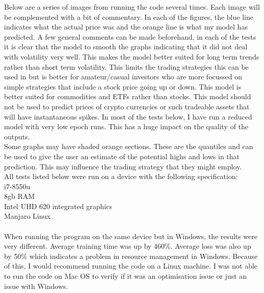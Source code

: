 \documentclass{article}
\begin{document}
Below are a series of images from running the code several times. Each image
will be complemented with a bit of commentary. In each of the figures, the blue
line indicates what the actual price was and the orange line is what my model
has predicted. A few general comments can be made beforehand, in each of the
tests it is clear that the model to smooth the graphs indicating that it did not
deal with volatility very well. This makes the model better suited for long term
trends rather than short term volatility. This limits the trading strategies this
can be used in but is better for amateur/casual investors who are more focussed
on simple strategies that include a stock price going up or down. This model is
better suited for commodities and ETFs rather than stocks. This model should
not be used to predict prices of crypto currencies or such tradeable assets that
will have instantaneous spikes. In most of the tests below, I have run a reduced
model with very low epoch runs. This has a huge impact on the quality of the
outputs.\\
Some graphs may have shaded orange sections. These are the quantiles and
can be used to give the user an estimate of the potential highs and lows in that
prediction. This may influence the trading strategy that they might employ.
\\
All tests listed below were run on a device with the following specification:\\
i7-8550u\\
8gb RAM \\
Intel UHD 620 integrated graphics \\
Manjaro Linux\\
\\
When running the program on the same device but in Windows, the results were very
different. Average training time was up by 460\%. Average loss was also up by
50\% which indicates a problem in resource management in Windows. Because of this,
I would recommend running the code on a Linux machine. I was not able to run the
code on Mac OS to verify if it was an optimisation issue or just an issue with
Windows.


\clearpage
\end{document}

